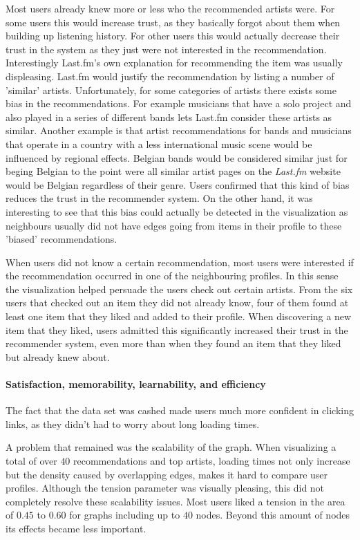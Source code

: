 Most users already knew more or less who the recommended artists were. For some users this would increase trust, as they basically forgot about them when building up listening history. For other users this would actually decrease their trust in the system as they just were not interested in the recommendation. Interestingly Last.fm's own explanation for recommending the item was usually displeasing. Last.fm would justify the recommendation by listing a number of 'similar' artists. Unfortunately, for some categories of artists there exists some bias in the recommendations. For example musicians that have a solo project and also played in a series of different bands lets Last.fm consider these artists as similar. Another example is that artist recommendations for bands and musicians that operate in a country with a less international music scene would be influenced by regional effects. Belgian bands would be considered similar just for beging Belgian to the point were all similar artist pages on the \emph{Last.fm} website would be Belgian regardless of their genre. Users confirmed that this kind of bias reduces the trust in the recommender system. On the other hand, it was interesting to see that this bias could actually be detected in the visualization as neighbours usually did not have edges going from items in their profile to these 'biased' recommendations.

When users did not know a certain recommendation, most users were interested if the recommendation occurred in one of the neighbouring profiles. In this sense the visualization helped persuade the users check out certain artists. From the six users that checked out an item they did not already know, four of them found at least one item that they liked and added to their profile. When discovering a new item that they liked, users admitted this significantly increased their trust in the recommender system, even more than when they found an item that they liked but already knew about.



\paragraph{Satisfaction, memorability, learnability, and efficiency}

The fact that the data set was cashed made users much more confident in clicking links, as they didn't had to worry about long loading times.

A problem that remained was the scalability of the graph. When visualizing a total of over $40$ recommendations and top artists, loading times not only increase but the density caused by overlapping edges, makes it hard to compare user profiles. Although the tension parameter was visually pleasing, this did not completely resolve these scalability issues. Most users liked a tension in the area of $0.45$ to $0.60$ for graphs including up to $40$ nodes. Beyond this amount of nodes its effects became less important.

